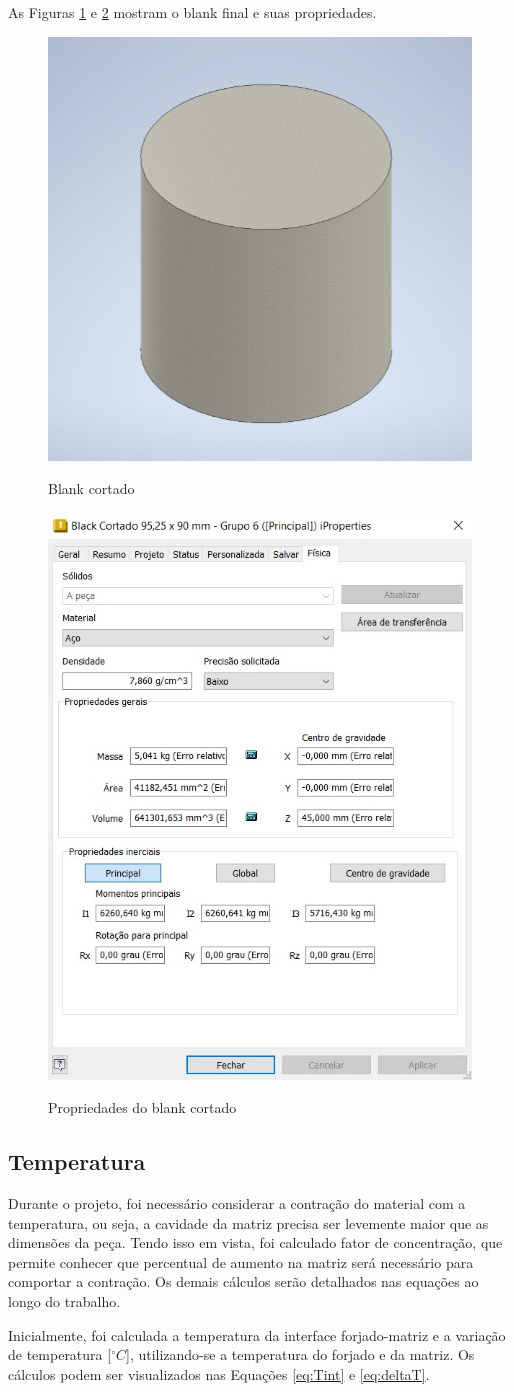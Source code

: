 \documentclass[deposito, acronym, symbols]{fei}
\begin{document}
As Figuras \ref{fig:blankforj} e \ref{fig:propblankforj} mostram o blank final e suas propriedades.

\begin{figure}[!htp]
    \centering
    \caption{Blank cortado}
    \includegraphics[width=0.3\linewidth]{Imagens/blank.jpeg}
    \label{fig:blankforj}
\end{figure}

 \begin{figure}[!htp]
    \centering
    \caption{Propriedades do blank cortado}
    \includegraphics[width=0.4\linewidth]{Imagens/prop blank.jpeg}
    \label{fig:propblankforj}
\end{figure}

\newpage
\subsection{Temperatura}

Durante o projeto, foi necessário considerar a contração do material com a temperatura, ou seja, a cavidade da matriz precisa ser levemente maior que as dimensões da peça. Tendo isso em vista, foi calculado fator de concentração, que permite conhecer que percentual de aumento na matriz será necessário para comportar a contração. Os demais cálculos serão detalhados nas equações ao longo do trabalho.


Inicialmente, foi calculada a temperatura da interface forjado-matriz e a variação de temperatura [$ ^{\circ}C$], utilizando-se a temperatura do forjado e da matriz. Os cálculos podem ser visualizados nas Equações \ref{eq:Tint} e \ref{eq:deltaT}.
\end{document}
